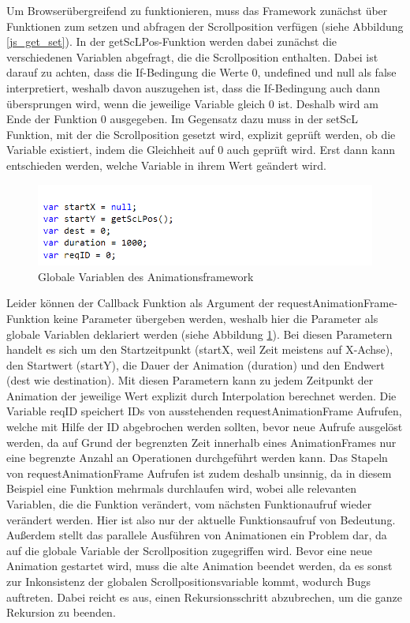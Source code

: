 Um Browserübergreifend zu funktionieren, muss das Framework zunächst über Funktionen zum setzen und abfragen der Scrollposition verfügen (siehe Abbildung \ref{js_get_set}). In der getScLPos-Funktion werden dabei zunächst die verschiedenen Variablen abgefragt, die die Scrollposition enthalten. Dabei ist darauf zu achten, dass die If-Bedingung die Werte 0, undefined und null als false interpretiert, weshalb davon auszugehen ist, dass die If-Bedingung auch dann übersprungen wird, wenn die jeweilige Variable gleich 0 ist. Deshalb wird am Ende der Funktion 0 ausgegeben. Im Gegensatz dazu muss in der setScL Funktion, mit der die Scrollposition gesetzt wird, explizit geprüft werden, ob die Variable existiert, indem die Gleichheit auf 0 auch geprüft wird. Erst dann kann entschieden werden, welche Variable in ihrem Wert geändert wird.
\begin{figure} [h]
\includegraphics[width=\textwidth]{./img/js_globals.png}
\caption{Globale Variablen des Animationsframework}
\label{js_globals}
\end{figure}
Leider können der Callback Funktion als Argument der requestAnimationFrame-Funktion keine Parameter übergeben werden, weshalb hier die Parameter als globale Variablen deklariert werden (siehe Abbildung \ref{js_globals}). Bei diesen Parametern handelt es sich um den Startzeitpunkt (startX, weil Zeit meistens auf X-Achse), den Startwert (startY), die Dauer der Animation (duration) und den Endwert (dest wie destination). Mit diesen Parametern kann zu jedem Zeitpunkt der Animation der jeweilige Wert explizit durch Interpolation berechnet werden. Die Variable reqID speichert IDs von ausstehenden requestAnimationFrame Aufrufen, welche mit Hilfe der ID abgebrochen werden sollten, bevor neue Aufrufe ausgelöst werden, da auf Grund der begrenzten Zeit innerhalb eines AnimationFrames nur eine begrenzte Anzahl an Operationen durchgeführt werden kann. Das Stapeln von requestAnimationFrame Aufrufen ist zudem deshalb unsinnig, da in diesem Beispiel eine Funktion mehrmals durchlaufen wird, wobei alle relevanten Variablen, die die Funktion verändert, vom nächsten Funktionaufruf wieder verändert werden. Hier ist also nur der aktuelle Funktionsaufruf von Bedeutung. Außerdem stellt das parallele Ausführen von Animationen ein Problem dar, da auf die globale Variable der Scrollposition zugegriffen wird. Bevor eine neue Animation gestartet wird, muss die alte Animation beendet werden, da es sonst zur Inkonsistenz der globalen Scrollpositionsvariable kommt, wodurch Bugs auftreten. Dabei reicht es aus, einen Rekursionsschritt abzubrechen, um die ganze Rekursion zu beenden.

